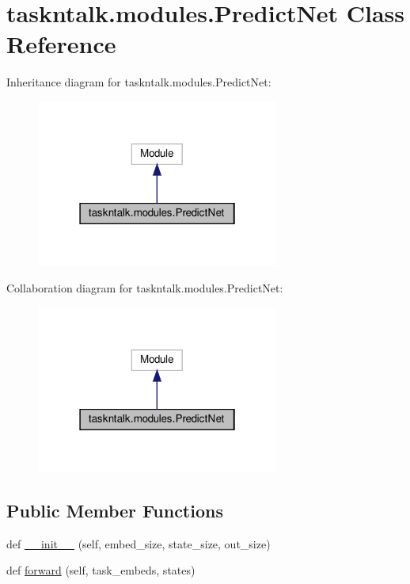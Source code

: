 \hypertarget{classtaskntalk_1_1modules_1_1PredictNet}{}\section{taskntalk.\+modules.\+Predict\+Net Class Reference}
\label{classtaskntalk_1_1modules_1_1PredictNet}


Inheritance diagram for taskntalk.\+modules.\+Predict\+Net\+:
\nopagebreak
\begin{figure}[H]
\begin{center}
\leavevmode
\includegraphics[width=226pt]{classtaskntalk_1_1modules_1_1PredictNet__inherit__graph}
\end{center}
\end{figure}


Collaboration diagram for taskntalk.\+modules.\+Predict\+Net\+:
\nopagebreak
\begin{figure}[H]
\begin{center}
\leavevmode
\includegraphics[width=226pt]{classtaskntalk_1_1modules_1_1PredictNet__coll__graph}
\end{center}
\end{figure}
\subsection*{Public Member Functions}
\begin{DoxyCompactItemize}
\item 
def \hyperlink{classtaskntalk_1_1modules_1_1PredictNet_ab9af189670626b4121ad1070dc41e04d}{\+\_\+\+\_\+init\+\_\+\+\_\+} (self, embed\+\_\+size, state\+\_\+size, out\+\_\+size)
\item 
def \hyperlink{classtaskntalk_1_1modules_1_1PredictNet_a4adb776b0030568ee90c3f8938990d27}{forward} (self, task\+\_\+embeds, states)
\end{DoxyCompactItemize}
